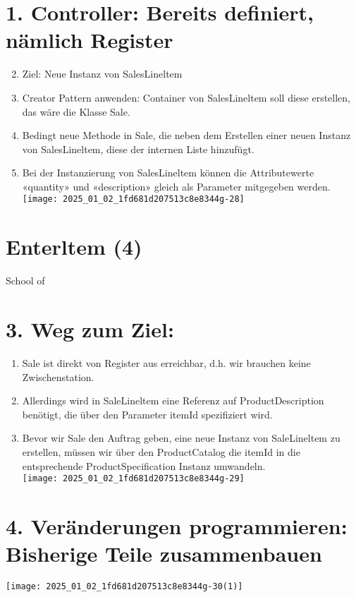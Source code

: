 \documentclass[10pt]{article}
\begin{document}
\section*{1. Controller: Bereits definiert, nämlich Register}
\begin{enumerate}
  \setcounter{enumi}{1}
  \item Ziel: Neue Instanz von SalesLineltem
  \item Creator Pattern anwenden: Container von SalesLineltem soll diese erstellen, das wäre die Klasse Sale.
  \item Bedingt neue Methode in Sale, die neben dem Erstellen einer neuen Instanz von SalesLineltem, diese der internen Liste hinzufügt.
  \item Bei der Instanzierung von SalesLineltem können die Attributewerte «quantity» und «description» gleich als Parameter mitgegeben werden.\\
\texttt{[image: 2025\_01\_02\_1fd681d207513c8e8344g-28]}
\end{enumerate}

\section*{Enterltem (4)}
School of

\section*{3. Weg zum Ziel:}
\begin{enumerate}
  \item Sale ist direkt von Register aus erreichbar, d.h. wir brauchen keine Zwischenstation.
  \item Allerdings wird in SaleLineltem eine Referenz auf ProductDescription benötigt, die über den Parameter itemId spezifiziert wird.
  \item Bevor wir Sale den Auftrag geben, eine neue Instanz von SaleLineltem zu erstellen, müssen wir über den ProductCatalog die itemId in die entsprechende ProductSpecification Instanz umwandeln.\\
\texttt{[image: 2025\_01\_02\_1fd681d207513c8e8344g-29]}
\end{enumerate}

\section*{4. Veränderungen programmieren: Bisherige Teile zusammenbauen}
\begin{center}
\texttt{[image: 2025\_01\_02\_1fd681d207513c8e8344g-30(1)]}
\end{center}
\end{document}
